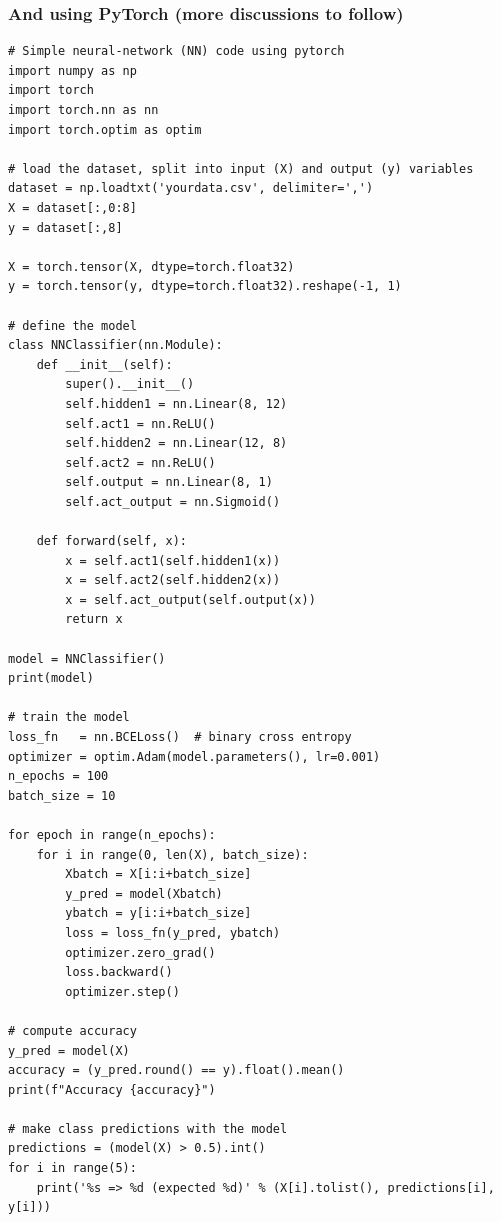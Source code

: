 \documentclass{beamer}
\begin{document}
\begin{frame}
\frametitle{And using PyTorch (more discussions to follow)}

\begin{verbatim}
# Simple neural-network (NN) code using pytorch
import numpy as np
import torch
import torch.nn as nn
import torch.optim as optim
 
# load the dataset, split into input (X) and output (y) variables
dataset = np.loadtxt('yourdata.csv', delimiter=',')
X = dataset[:,0:8]
y = dataset[:,8]
 
X = torch.tensor(X, dtype=torch.float32)
y = torch.tensor(y, dtype=torch.float32).reshape(-1, 1)

# define the model
class NNClassifier(nn.Module):
    def __init__(self):
        super().__init__()
        self.hidden1 = nn.Linear(8, 12)
        self.act1 = nn.ReLU()
        self.hidden2 = nn.Linear(12, 8)
        self.act2 = nn.ReLU()
        self.output = nn.Linear(8, 1)
        self.act_output = nn.Sigmoid()
 
    def forward(self, x):
        x = self.act1(self.hidden1(x))
        x = self.act2(self.hidden2(x))
        x = self.act_output(self.output(x))
        return x
 
model = NNClassifier()
print(model)
 
# train the model
loss_fn   = nn.BCELoss()  # binary cross entropy
optimizer = optim.Adam(model.parameters(), lr=0.001)
n_epochs = 100
batch_size = 10
 
for epoch in range(n_epochs):
    for i in range(0, len(X), batch_size):
        Xbatch = X[i:i+batch_size]
        y_pred = model(Xbatch)
        ybatch = y[i:i+batch_size]
        loss = loss_fn(y_pred, ybatch)
        optimizer.zero_grad()
        loss.backward()
        optimizer.step()
 
# compute accuracy
y_pred = model(X)
accuracy = (y_pred.round() == y).float().mean()
print(f"Accuracy {accuracy}")

# make class predictions with the model
predictions = (model(X) > 0.5).int()
for i in range(5):
    print('%s => %d (expected %d)' % (X[i].tolist(), predictions[i], y[i]))


\end{verbatim}
\end{frame}
\end{document}
